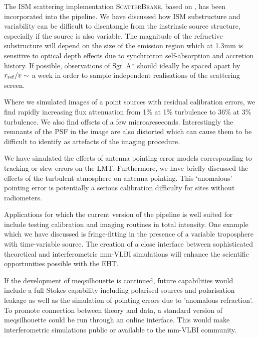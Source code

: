 The ISM scattering implementation \textsc{ScatterBrane}, based on \citet*{Johnson_2015a}, has been incorporated into the pipeline. We have discussed how ISM substructure and variability can be difficult to disentangle from the instrinsic source structure, especially if the source is also variable. The magnitude of the refractive substructure will depend on the size of the emission region which at 1.3mm is sensitive to optical depth effects due to synchrotron self-absorption and accretion history. If possible, observations of Sgr~A* should ideally be spaced apart by $r_{\rm ref}/v \sim$ a week  in order to sample independent realisations of the scattering screen. 


Where we simulated images of a point sources with residual calibration errors, we find rapidly increasing flux attenuation from 1\% at 1\% turbulence to 36\% at 3\% turbulence. We also find offsets of a few microarcseconds. Interestingly the remnants of the PSF in the image are also distorted which can cause them to be difficult to identify as artefacts of the imaging procedure.


We have simulated the effects of antenna pointing error models corresponding to tracking or slew errors on the LMT. Furthermore, we have briefly discussed the effects of the turbulent atmosphere on antenna pointing. This `anomalous' pointing error is potentially a serious calibration difficulty for sites without radiometers. 

%
Applications for which the current version of the pipeline is well suited for include testing calibration and imaging routines in total intensity. One example which we have discussed is fringe-fitting in the presence of a variable troposphere with time-variable source.  
The creation of a close interface between sophisticated theoretical and interferometric mm-VLBI simulations will enhance the scientific opportunities possible with the EHT. 

If the development of {\sc meqsilhouette} is continued, future capabilities would include a full Stokes capability including polarised sources and polarisation leakage as well as the simulation of pointing errors due to 'anomalous refraction'.  To promote connection between theory and data, a standard version of {\sc meqsilhouette} could be run through an online interface. This would make interferometric simulations public or available to the mm-VLBI community.  














